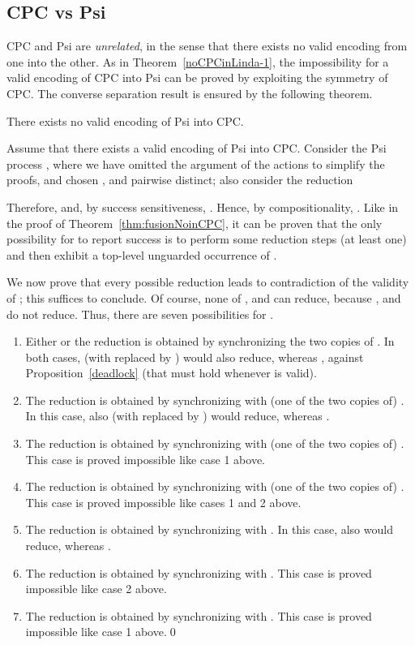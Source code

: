 \documentclass{LMCS}
\begin{document}
\subsection{CPC vs Psi}

CPC and Psi are {\em unrelated}, in the sense that there exists no valid
encoding from one into the other. As in Theorem~\ref{noCPCinLinda-1}, 
the impossibility for a valid
encoding of CPC into Psi can be proved by exploiting 
the symmetry of CPC.
The converse separation result is ensured by the following theorem.

\begin{thm}
\label{thm:psiNoinCPC}
There exists no valid encoding of Psi into CPC.
\end{thm}
\proof
Assume that there exists a valid encoding 
of Psi into CPC. Consider the Psi process 
,
where we have omitted the argument of the actions to simplify the proofs,
and chosen ,  and  pairwise distinct; also consider the reduction

Therefore,  and, by success sensitiveness, . 
Hence, by compositionality, .
Like in the proof of Theorem~\ref{thm:fusionNoinCPC}, it can be proven that the only possibility 
for  to report success is to perform some reduction steps (at least one) and then exhibit
a top-level unguarded occurrence of .

We now prove that every possible reduction leads to contradiction of the validity of ;
this suffices to conclude. Of course, none of , 
and  can reduce, because ,  and 
do not reduce. Thus, there are seven possibilities for .
\begin{enumerate}
	\item Either  or the reduction is obtained by synchronizing
	the two copies of . In both cases, 
    (with  replaced by )
	would also reduce, whereas , 
	against Proposition~\ref{deadlock} (that must hold whenever  is valid).

	\item The reduction is obtained by synchronizing 
	with (one of the two copies of) . In this case, 
	also 
    (with  replaced by )
	would reduce, whereas .

	\item The reduction is obtained by synchronizing 
	with (one of the two copies of) . This case is
	proved impossible like case 1 above.

	\item The reduction is obtained by synchronizing 
	with (one of the two copies of) . This case is
	proved impossible like cases 1 and 2 above.

	\item The reduction is obtained by synchronizing 
	with . In this case, 
	also 
	would reduce, whereas .

	\item The reduction is obtained by synchronizing 
	with . This case is
	proved impossible like case 2 above.

	\item The reduction is obtained by synchronizing 
	with . This case is
	proved impossible like case 1 above.\qed
\end{enumerate}
\end{document}
